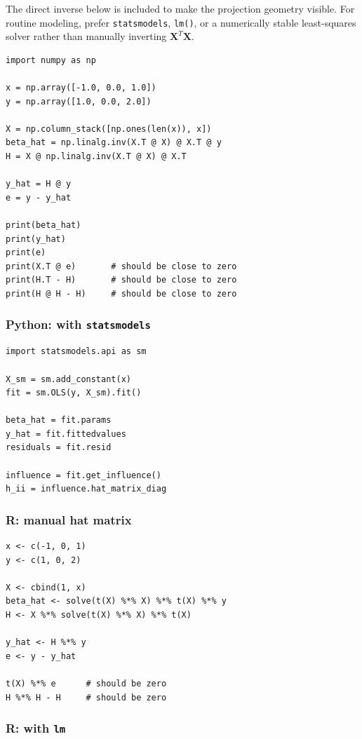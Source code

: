 The direct inverse below is included to make the projection geometry visible.  For routine modeling, prefer \texttt{statsmodels}, \texttt{lm()}, or a numerically stable least-squares solver rather than manually inverting \(\mathbf{X}^T\mathbf{X}\).

\begin{verbatim}
import numpy as np

x = np.array([-1.0, 0.0, 1.0])
y = np.array([1.0, 0.0, 2.0])

X = np.column_stack([np.ones(len(x)), x])
beta_hat = np.linalg.inv(X.T @ X) @ X.T @ y
H = X @ np.linalg.inv(X.T @ X) @ X.T

y_hat = H @ y
e = y - y_hat

print(beta_hat)
print(y_hat)
print(e)
print(X.T @ e)       # should be close to zero
print(H.T - H)       # should be close to zero
print(H @ H - H)     # should be close to zero
\end{verbatim}

\subsubsection*{Python: with \texttt{statsmodels}}

\begin{verbatim}
import statsmodels.api as sm

X_sm = sm.add_constant(x)
fit = sm.OLS(y, X_sm).fit()

beta_hat = fit.params
y_hat = fit.fittedvalues
residuals = fit.resid

influence = fit.get_influence()
h_ii = influence.hat_matrix_diag
\end{verbatim}

\subsubsection*{R: manual hat matrix}

\begin{verbatim}
x <- c(-1, 0, 1)
y <- c(1, 0, 2)

X <- cbind(1, x)
beta_hat <- solve(t(X) %*% X) %*% t(X) %*% y
H <- X %*% solve(t(X) %*% X) %*% t(X)

y_hat <- H %*% y
e <- y - y_hat

t(X) %*% e      # should be zero
H %*% H - H     # should be zero
\end{verbatim}

\subsubsection*{R: with \texttt{lm}}

